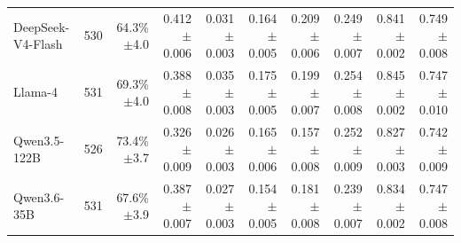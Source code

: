 \begin{table}[t]
\begin{tabular*}{\textwidth}{@{\extracolsep{\fill}}lrrrrrrrrr@{}}
DeepSeek-V4-Flash & 530 & \shortstack[r]{64.3\%\\{\scriptsize $\pm$4.0}} & \shortstack[r]{0.412\\{\scriptsize $\pm$0.006}} & \shortstack[r]{0.031\\{\scriptsize $\pm$0.003}} & \shortstack[r]{0.164\\{\scriptsize $\pm$0.005}} & \shortstack[r]{0.209\\{\scriptsize $\pm$0.006}} & \shortstack[r]{0.249\\{\scriptsize $\pm$0.007}} & \shortstack[r]{0.841\\{\scriptsize $\pm$0.002}} & \shortstack[r]{0.749\\{\scriptsize $\pm$0.008}} \\
Llama-4 & 531 & \shortstack[r]{69.3\%\\{\scriptsize $\pm$4.0}} & \shortstack[r]{0.388\\{\scriptsize $\pm$0.008}} & \shortstack[r]{0.035\\{\scriptsize $\pm$0.003}} & \shortstack[r]{0.175\\{\scriptsize $\pm$0.005}} & \shortstack[r]{0.199\\{\scriptsize $\pm$0.007}} & \shortstack[r]{0.254\\{\scriptsize $\pm$0.008}} & \shortstack[r]{0.845\\{\scriptsize $\pm$0.002}} & \shortstack[r]{0.747\\{\scriptsize $\pm$0.010}} \\
Qwen3.5-122B & 526 & \shortstack[r]{73.4\%\\{\scriptsize $\pm$3.7}} & \shortstack[r]{0.326\\{\scriptsize $\pm$0.009}} & \shortstack[r]{0.026\\{\scriptsize $\pm$0.003}} & \shortstack[r]{0.165\\{\scriptsize $\pm$0.006}} & \shortstack[r]{0.157\\{\scriptsize $\pm$0.008}} & \shortstack[r]{0.252\\{\scriptsize $\pm$0.009}} & \shortstack[r]{0.827\\{\scriptsize $\pm$0.003}} & \shortstack[r]{0.742\\{\scriptsize $\pm$0.009}} \\
Qwen3.6-35B & 531 & \shortstack[r]{67.6\%\\{\scriptsize $\pm$3.9}} & \shortstack[r]{0.387\\{\scriptsize $\pm$0.007}} & \shortstack[r]{0.027\\{\scriptsize $\pm$0.003}} & \shortstack[r]{0.154\\{\scriptsize $\pm$0.005}} & \shortstack[r]{0.181\\{\scriptsize $\pm$0.008}} & \shortstack[r]{0.239\\{\scriptsize $\pm$0.007}} & \shortstack[r]{0.834\\{\scriptsize $\pm$0.002}} & \shortstack[r]{0.747\\{\scriptsize $\pm$0.008}} \\

\end{tabular*}
\end{table}
